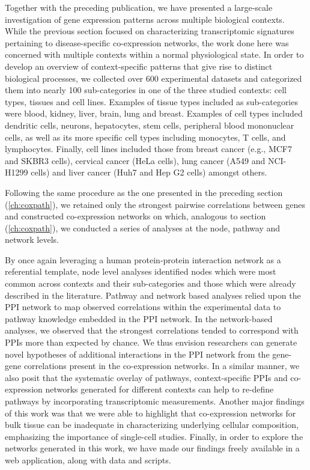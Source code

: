 Together with the preceding publication, we have presented a large-scale investigation of gene expression patterns across multiple biological contexts. While the previous section focused on characterizing transcriptomic signatures pertaining to disease-specific co-expression networks, the work done here was concerned with multiple contexts within a normal physiological state. In order to develop an overview of context-specific patterns that give rise to distinct biological processes, we collected over 600 experimental datasets and categorized them into nearly 100 sub-categories in one of the three studied contexts: cell types, tissues and cell lines. Examples of tissue types included as sub-categories were blood, kidney, liver, brain, lung and breast. Examples of cell types included dendritic cells, neurons, hepatocytes, stem cells, peripheral blood mononuclear cells, as well as its more specific cell types including monocytes, T cells, and lymphocytes. Finally, cell lines included those from breast cancer (e.g., MCF7 and SKBR3 cells), cervical cancer (HeLa cells), lung cancer (A549 and NCI-H1299 cells) and liver cancer (Huh7 and Hep G2 cells) amongst others. 

Following the same procedure as the one presented in the preceding section (\ref{ch:coxpath}), we retained only the strongest pairwise correlations between genes and constructed co-expression networks on which, analogous to section (\ref{ch:coxpath}), we conducted a series of analyses at the node, pathway and network levels.

By once again leveraging a human protein-protein interaction network as a referential template, node level analyses identified nodes which were most common across contexts and their sub-categories and those which were already described in the literature. Pathway and network based analyses relied upon the PPI network to map observed correlations within the experimental data to pathway knowledge embedded in the PPI network. In the network-based analyses, we observed that the strongest correlations tended to correspond with PPIs more than expected by chance. We thus envision researchers can generate novel hypotheses of additional interactions in the PPI network from the gene-gene correlations present in the co-expression networks. In a similar manner, we also posit that the systematic overlay of pathways, context-specific PPIs and co-expression networks generated for different contexts can help to re-define pathways by incorporating transcriptomic measurements. Another major findings of this work was that we were able to highlight that co-expression networks for bulk tissue can be inadequate in characterizing underlying cellular composition, emphasizing the importance of single-cell studies. Finally, in order to explore the networks generated in this work, we have made our findings freely available in a web application, along with data and scripts. 

